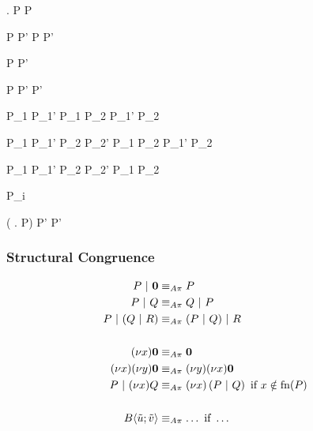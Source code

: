   { . P  P}

  {P  P'}
  {P  P'}

  {P \apireduction{\alpha} P'}
  { \apireduction{\alpha} }

  {P  P'}
  {  P'}

  {P_1 \apireduction{\alpha} P_1'}
  {P_1 \apar P_2 \apireduction{\alpha} P_1' \apar P_2}

  {P_1  P_1'}
  {P_2  P_2'}
  {P_1 \apar P_2 \apireduction{\actsilent} P_1' \apar P_2}

  {P_1  P_1'}
  {P_2  P_2'}
  {P_1 \apar P_2 \apireduction{\actsilent} }

  { \apireduction{\actsilent} P_i}

  {( . P)
    \apireduction{\alpha} P'}
  { \apireduction{\alpha} P'}



\subsubsection{Structural Congruence}

\begin{align*}
  P \apar \anullproc
    &\astructequ P \\
  P \apar Q
    &\astructequ Q \apar P \\
  P \apar (Q \apar R)
    &\astructequ (P \apar Q) \apar R \\
  \\
  \anew{x}{\anullproc}
    &\astructequ \anullproc \\
  \anew{x}{\anew{y}{\anullproc}}
    &\astructequ \anew{y}{\anew{x}{\anullproc}} \\
  P \apar \anew{x}{Q}
    &\astructequ \anew*{x}{P \apar Q} \text{ if } x \notin \fn{P} \\
  \\
  \ains{B}{\tilde{u}}{\tilde{v}}
    &\astructequ \ldots \text{ if } \ldots %
\end{align*}



